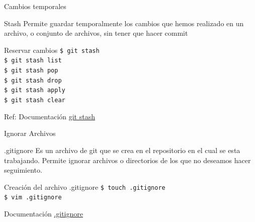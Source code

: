 \documentclass{beamer}
\begin{document}
  \begin{frame}{Cambios temporales}
    
    \begin{exampleblock}{Stash}
      Permite guardar temporalmente los cambios que hemos realizado en un archivo, o conjunto de archivos, sin tener que hacer commit
    \end{exampleblock}

    \begin{block}{Reservar cambios}
      {\texttt{\$ git stash}} \\
      {\texttt{\$ git stash list}} \\
      {\texttt{\$ git stash pop}} \\
      {\texttt{\$ git stash drop}} \\
      {\texttt{\$ git stash apply}} \\
      {\texttt{\$ git stash clear}} 
    \end{block}

    Ref: Documentación \href{https://git-scm.com/docs/git-stash}{git stash}
  \end{frame}
  
\begin{frame} {Ignorar Archivos}

  \begin{alertblock}{.gitignore}
    Es un archivo de git que se crea en el repositorio en el cual se esta trabajando.
    Permite ignorar archivos o directorios de los que no deseamos hacer seguimiento.
  \end{alertblock}


    \begin{block}{Creación del archivo .gitignore}
      {\texttt{\$ touch .gitignore }} \\ 
      {\texttt{\$ vim .gitignore }}
    \end{block}

    {Documentación \href{https://docs.github.com/es/get-started/getting-started-with-git/ignoring-files}{.gitignore}}

\end{frame}
\end{document}
